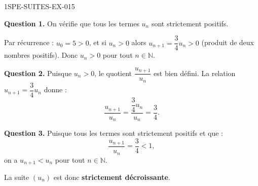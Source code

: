 \begin{corrige}{1SPE-SUITES-EX-015}


\textbf{Question 1.} On vérifie que tous les termes $u_n$ sont strictement positifs.

Par récurrence : $u_0 = 5 > 0$, et si $u_n > 0$ alors $u_{n+1} = \dfrac{3}{4} u_n > 0$ (produit de deux nombres positifs). Donc $u_n > 0$ pour tout $n \in \mathbb{N}$.

\textbf{Question 2.} Puisque $u_n > 0$, le quotient $\dfrac{u_{n+1}}{u_n}$ est bien défini. La relation $u_{n+1} = \dfrac{3}{4}u_n$ donne :
\[
\frac{u_{n+1}}{u_n} = \frac{\dfrac{3}{4} u_n}{u_n} = \frac{3}{4}.
\]


\textbf{Question 3.} Puisque tous les termes sont strictement positifs et que :
\[
\frac{u_{n+1}}{u_n} = \frac{3}{4} < 1,
\]
on a $u_{n+1} < u_n$ pour tout $n \in \mathbb{N}$.

La suite $(u_n)$ est donc \textbf{strictement décroissante}.

\end{corrige}
